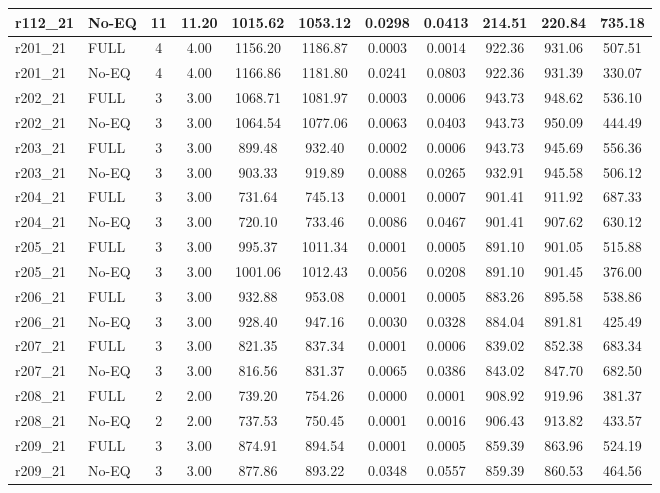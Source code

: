 \begin{longtable}{@{\extracolsep{\fill}}llccccccccc@{}}
r112\_21 & No-EQ & 11 & 11.20 & 1015.62 & 1053.12 & 0.0298 & 0.0413 & 214.51 & 220.84 & 735.18 \\
\midrule
r201\_21 & FULL & 4 & 4.00 & 1156.20 & 1186.87 & 0.0003 & 0.0014 & 922.36 & 931.06 & 507.51 \\
r201\_21 & No-EQ & 4 & 4.00 & 1166.86 & 1181.80 & 0.0241 & 0.0803 & 922.36 & 931.39 & 330.07 \\
\midrule
r202\_21 & FULL & 3 & 3.00 & 1068.71 & 1081.97 & 0.0003 & 0.0006 & 943.73 & 948.62 & 536.10 \\
r202\_21 & No-EQ & 3 & 3.00 & 1064.54 & 1077.06 & 0.0063 & 0.0403 & 943.73 & 950.09 & 444.49 \\
\midrule
r203\_21 & FULL & 3 & 3.00 & 899.48 & 932.40 & 0.0002 & 0.0006 & 943.73 & 945.69 & 556.36 \\
r203\_21 & No-EQ & 3 & 3.00 & 903.33 & 919.89 & 0.0088 & 0.0265 & 932.91 & 945.58 & 506.12 \\
\midrule
r204\_21 & FULL & 3 & 3.00 & 731.64 & 745.13 & 0.0001 & 0.0007 & 901.41 & 911.92 & 687.33 \\
r204\_21 & No-EQ & 3 & 3.00 & 720.10 & 733.46 & 0.0086 & 0.0467 & 901.41 & 907.62 & 630.12 \\
\midrule
r205\_21 & FULL & 3 & 3.00 & 995.37 & 1011.34 & 0.0001 & 0.0005 & 891.10 & 901.05 & 515.88 \\
r205\_21 & No-EQ & 3 & 3.00 & 1001.06 & 1012.43 & 0.0056 & 0.0208 & 891.10 & 901.45 & 376.00 \\
\midrule
r206\_21 & FULL & 3 & 3.00 & 932.88 & 953.08 & 0.0001 & 0.0005 & 883.26 & 895.58 & 538.86 \\
r206\_21 & No-EQ & 3 & 3.00 & 928.40 & 947.16 & 0.0030 & 0.0328 & 884.04 & 891.81 & 425.49 \\
\midrule
r207\_21 & FULL & 3 & 3.00 & 821.35 & 837.34 & 0.0001 & 0.0006 & 839.02 & 852.38 & 683.34 \\
r207\_21 & No-EQ & 3 & 3.00 & 816.56 & 831.37 & 0.0065 & 0.0386 & 843.02 & 847.70 & 682.50 \\
\midrule
r208\_21 & FULL & 2 & 2.00 & 739.20 & 754.26 & 0.0000 & 0.0001 & 908.92 & 919.96 & 381.37 \\
r208\_21 & No-EQ & 2 & 2.00 & 737.53 & 750.45 & 0.0001 & 0.0016 & 906.43 & 913.82 & 433.57 \\
\midrule
r209\_21 & FULL & 3 & 3.00 & 874.91 & 894.54 & 0.0001 & 0.0005 & 859.39 & 863.96 & 524.19 \\
r209\_21 & No-EQ & 3 & 3.00 & 877.86 & 893.22 & 0.0348 & 0.0557 & 859.39 & 860.53 & 464.56 \\

\end{longtable}
